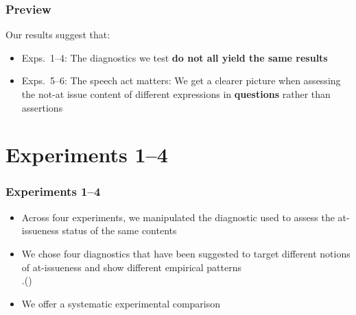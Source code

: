 \documentclass[compress, xcolor = dvipsnames, aspectratio=169]{beamer}
\begin{document}
	\begin{frame}\frametitle{Preview}
	
		Our results suggest that:
		\begin{itemize}
			\item Exps.~1–4: The diagnostics we test \textbf{do not all yield the same results}
			\item Exps.~5–6: The speech act matters: We get a clearer picture when assessing the not-at issue content of different expressions in \textbf{questions} rather than assertions
		\end{itemize}
	
	\end{frame}

\section{Experiments 1–4}
	\begin{frame}\frametitle{Experiments 1–4}
		\begin{itemize}
			\item Across four experiments, we manipulated the diagnostic used to assess the at-issueness status of the same contents\pause

			\item We chose four diagnostics that have been suggested to target different notions of at-issueness and show different empirical patterns\\ 
			\phantom.\hfill {\scriptsize(\citealt{snider_anaphoric_2017,snider_at-issuenessne_2017,snider_distinguishing_2018,koev_notions_2018,faller_discourse_2019,korotkova_evidential_2020})}\pause

			\item We offer a systematic experimental comparison

		\end{itemize}
			
	\end{frame}
\end{document}
